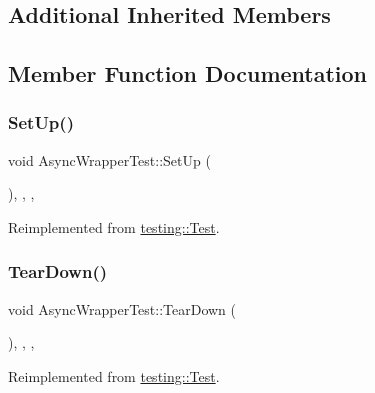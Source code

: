 \subsection*{Additional Inherited Members}


\subsection{Member Function Documentation}
\mbox{\label{classAsyncWrapperTest_afa76a8945a58c9c2ad9e1cd718436671}} 
\subsubsection{\texorpdfstring{SetUp()}{SetUp()}}
{\footnotesize\ttfamily void Async\+Wrapper\+Test\+::\+Set\+Up (\begin{DoxyParamCaption}{ }\end{DoxyParamCaption})\hspace{0.3cm}{\ttfamily [inline]}, {\ttfamily [override]}, {\ttfamily [protected]}, {\ttfamily [virtual]}}



Reimplemented from \mbox{\hyperlink{classtesting_1_1Test_a190315150c303ddf801313fd1a777733}{testing\+::\+Test}}.

\mbox{\label{classAsyncWrapperTest_ab19074e811df43bfa1b5d5c3f424f971}} 
\subsubsection{\texorpdfstring{TearDown()}{TearDown()}}
{\footnotesize\ttfamily void Async\+Wrapper\+Test\+::\+Tear\+Down (\begin{DoxyParamCaption}{ }\end{DoxyParamCaption})\hspace{0.3cm}{\ttfamily [inline]}, {\ttfamily [override]}, {\ttfamily [protected]}, {\ttfamily [virtual]}}



Reimplemented from \mbox{\hyperlink{classtesting_1_1Test_a5f0ab439802cbe0ef7552f1a9f791923}{testing\+::\+Test}}.



